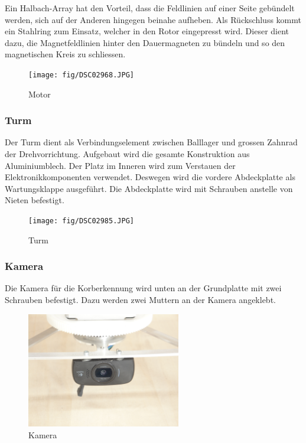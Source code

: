 \noindent
Ein Halbach-Array hat den Vorteil, dass die Feldlinien auf einer 
Seite gebündelt werden, sich auf der Anderen hingegen beinahe aufheben. 
Als Rückschluss kommt ein Stahlring zum Einsatz, welcher in den Rotor 
eingepresst wird. Dieser dient dazu, die Magnetfeldlinien hinter den 
Dauermagneten zu bündeln und so den magnetischen Kreis zu schliessen. 
\begin{figure}[h!]
    \centering
    \texttt{[image: fig/DSC02968.JPG]}
    \caption{Motor}
    \label{fig:motor}
\end{figure}

\clearpage
\subsubsection{Turm}
\label{sec:turm}
Der Turm dient als Verbindungselement zwischen Balllager und grossen Zahnrad 
der Drehvorrichtung. Aufgebaut wird die gesamte Konstruktion aus 
Aluminiumblech. Der Platz im Inneren wird zum Verstauen der 
Elektronikkomponenten verwendet. Deswegen wird die vordere Abdeckplatte als 
Wartungsklappe ausgeführt. Die Abdeckplatte wird mit Schrauben anstelle von 
Nieten befestigt.
\begin{figure}[h!]
    \centering
    \texttt{[image: fig/DSC02985.JPG]}
    \caption{Turm}
    \label{fig:turm}
\end{figure}

\subsubsection{Kamera}
\label{sec:camera}
Die Kamera für die Korberkennung wird unten an der Grundplatte mit zwei 
Schrauben befestigt. Dazu werden zwei Muttern an der Kamera angeklebt. 
\begin{figure}[h!]
    \centering
    \includegraphics[width=0.6\textwidth, trim=400 400 400 400, clip=true]{fig/DSC02993.JPG}
    \caption{Kamera}
    \label{fig:camera}
\end{figure}
